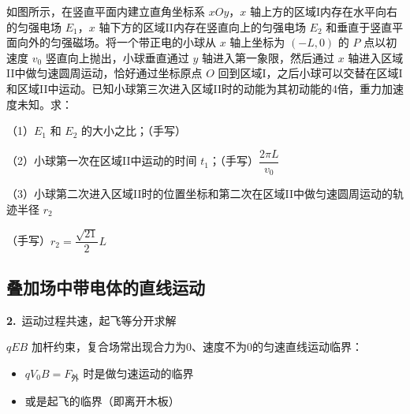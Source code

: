 \begin{problem}[（20分）]
如图所示，在竖直平面内建立直角坐标系 $xOy$，$x$ 轴上方的区域I内存在水平向右的匀强电场 $E_1$，$x$ 轴下方的区域II内存在竖直向上的匀强电场 $E_2$ 和垂直于竖直平面向外的匀强磁场。将一个带正电的小球从 $x$ 轴上坐标为 $(-L,0)$ 的 $P$ 点以初速度 $v_0$ 竖直向上抛出，小球垂直通过 $y$ 轴进入第一象限，然后通过 $x$ 轴进入区域II中做匀速圆周运动，恰好通过坐标原点 $O$ 回到区域I，之后小球可以交替在区域I和区域II中运动。已知小球第三次进入区域II时的动能为其初动能的4倍，重力加速度未知。求：

（1）$E_1$ 和 $E_2$ 的大小之比；\quad （手写）%

（2）小球第一次在区域II中运动的时间 $t_1$；\quad （手写）$\dfrac{2\pi L}{v_0}$

（3）小球第二次进入区域II时的位置坐标和第二次在区域II中做匀速圆周运动的轨迹半径 $r_2$

（手写）$r_2=\dfrac{\sqrt{21}}{2}L$

\end{problem}

\subsection{叠加场中带电体的直线运动}


\textbf{2.}\ 运动过程共速，起飞等分开求解

$qEB$ 加杆约束，复合场常出现合力为0、速度不为0的匀速直线运动临界：
\begin{itemize}
\item $qV_0B=F_{\text{外}}$ 时是做匀速运动的临界
\item 或是起飞的临界（即离开木板）
\end{itemize}


